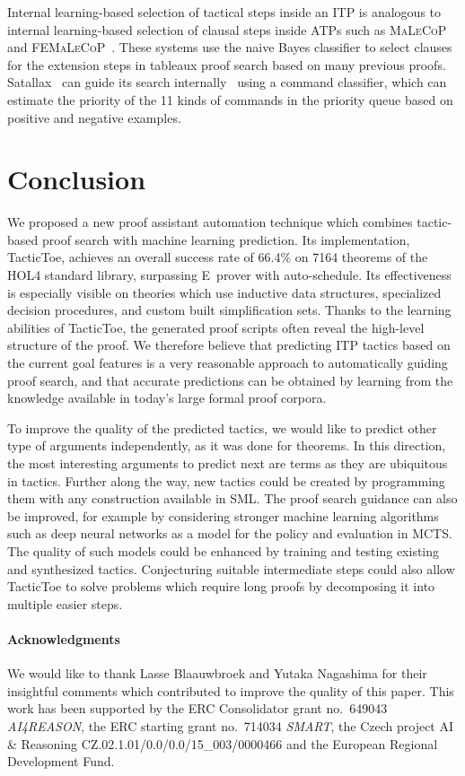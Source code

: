 \documentclass[runningheads,a4paper,draft]{svjour3}
\def\holfour{\textsf{HOL4}\xspace}
\def\eprover{\textsf{E~prover}\xspace}
\def\sml{\textsf{SML}\xspace}
\def\tactictoe{\textsf{TacticToe}\xspace}
\begin{document}
Internal learning-based selection of tactical steps inside an ITP is analogous
to internal learning-based selection of clausal steps inside ATPs such as
\textsc{MaLeCoP}~\cite{malecop} and \textsc{FEMaLeCoP}~\cite{femalecop}. These
systems
use the naive Bayes classifier to  select clauses for the extension steps in
tableaux proof search based on many previous proofs. Satallax~\cite{Brown2012a}
can guide its
search internally~\cite{mllax} using a command classifier, which can estimate
the priority of the 11 kinds of
commands in the priority queue based on positive and negative examples.

\section{Conclusion}\label{sec:concl}
We proposed a new proof assistant automation technique which combines
tactic-based proof search with machine learning prediction.
Its implementation, \tactictoe, achieves an overall success rate of 66.4\%
on 7164 theorems of the \holfour standard library, surpassing \eprover
with auto-schedule. Its
effectiveness is especially visible on
theories which use inductive data structures, specialized decision procedures,
and custom built simplification sets.
Thanks to the learning abilities of \tactictoe, the generated proof scripts
often reveal the high-level structure of the proof. %
We therefore believe that predicting ITP tactics based on the current goal
features is a very reasonable approach to automatically guiding proof search,
and that accurate predictions can be obtained by learning from the knowledge
available in today's large formal proof corpora.

To improve the quality of the predicted tactics,
we would like to predict other type of arguments independently, as it was done
for theorems. In this direction, the most interesting arguments to
predict next are terms as they are ubiquitous in tactics. Further along the way,
new tactics could be created by programming them with any construction
available in \sml.
The proof search guidance can also be improved, for example by considering
stronger machine learning algorithms
such as deep neural networks as a model for the policy and evaluation in MCTS.
The quality of such models could be enhanced by
training and testing existing and synthesized tactics.
Conjecturing suitable intermediate steps could also allow \tactictoe to solve
problems which require long proofs by decomposing it into multiple easier
steps.

\paragraph{Acknowledgments}\label{sect:acks}
We would like to thank Lasse Blaauwbroek and Yutaka Nagashima for their 
insightful comments which
contributed to improve the quality of this paper. This work has been supported
by the ERC Consolidator grant no.\ 649043 \textit{AI4REASON}, the ERC starting
grant no.\ 714034 \textit{SMART}, the Czech 
project AI \& Reasoning CZ.02.1.01/0.0/0.0/15\_003/0000466 and the 
European Regional Development Fund.



\end{document}
